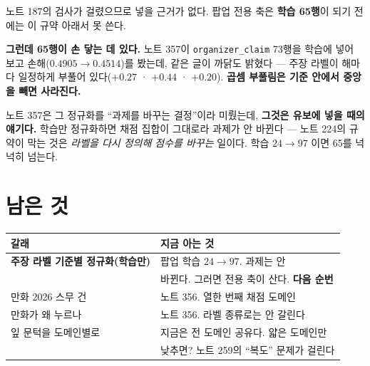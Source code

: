 \documentclass[11pt]{article}
\begin{document}
노트 187의 검사가 걸렸으므로 넣을 근거가 없다. 팝업 전용 축은
\textbf{학습 65행}이 되기 전에는 이 규약 아래서 못 쓴다.

\textbf{그런데 65행이 손 닿는 데 있다.} 노트 357이 \texttt{organizer\_claim}
73행을 학습에 넣어 보고 손해($0.4905 \to 0.4514$)를 봤는데, 같은 글이
까닭도 밝혔다 --- 주장 라벨이 해마다 일정하게 부풀어 있다($+0.27$ ·
$+0.44$ · $+0.20$). \textbf{곱셈 부풀림은 기준 안에서 중앙을 빼면
사라진다.}

노트 357은 그 정규화를 ``과제를 바꾸는 결정''이라 미뤘는데,
\textbf{그것은 유보에 넣을 때의 얘기다.} 학습만 정규화하면 채점 집합이
그대로라 과제가 안 바뀐다 --- 노트 224의 규약이 막는 것은 \emph{라벨을
다시 정의해 점수를 바꾸는} 일이다. 학습 $24 \to 97$ 이면 65를 넉넉히
넘는다.

\section{남은 것}

\begin{center}
\begin{tabular}{ll}
\hline
갈래 & 지금 아는 것 \\
\hline
\textbf{주장 라벨 기준별 정규화(학습만)} & 팝업 학습 $24 \to 97$. 과제는 안 \\
 & 바뀐다. 그러면 전용 축이 산다. \textbf{다음 순번} \\
만화 2026 스무 건 & 노트 356. 열한 번째 채점 도메인 \\
만화가 왜 누르나 & 노트 356. 라벨 종류로는 안 갈린다 \\
잎 문턱을 도메인별로 & 지금은 전 도메인 공유다. 얇은 도메인만 \\
 & 낮추면? 노트 259의 ``복도'' 문제가 걸린다 \\
\hline
\end{tabular}
\end{center}
\end{document}
